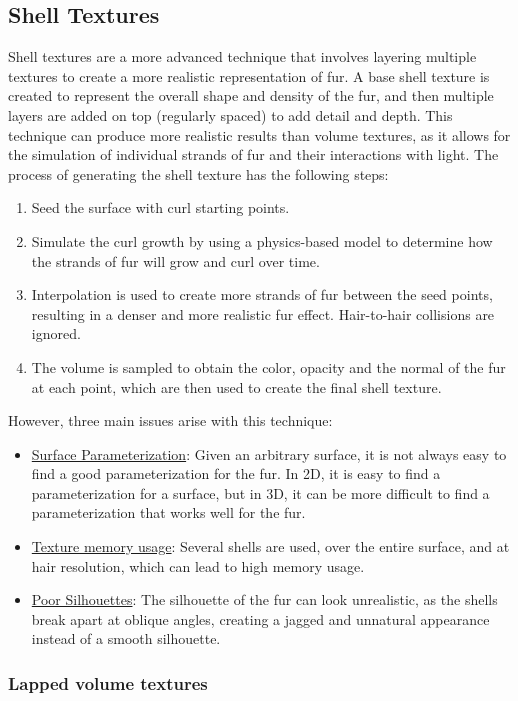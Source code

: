 \subsection{Shell Textures}

Shell textures are a more advanced technique that involves layering multiple textures to create a more realistic representation of fur. A base shell texture is created to represent the overall shape and density of the fur, and then multiple layers are added on top (regularly spaced) to add detail and depth. This technique can produce more realistic results than volume textures, as it allows for the simulation of individual strands of fur and their interactions with light. The process of generating the shell texture has the following steps:
\begin{enumerate}
    \item Seed the surface with curl starting points.
    \item Simulate the curl growth by using a physics-based model to determine how the strands of fur will grow and curl over time.
    \item Interpolation is used to create more strands of fur between the seed points, resulting in a denser and more realistic fur effect. Hair-to-hair collisions are ignored.
    \item The volume is sampled to obtain the color, opacity and the normal of the fur at each point, which are then used to create the final shell texture.
\end{enumerate}

However, three main issues arise with this technique:
\begin{itemize}
    \item \ul{Surface Parameterization}: Given an arbitrary surface, it is not always easy to find a good parameterization for the fur. In 2D, it is easy to find a parameterization for a surface, but in 3D, it can be more difficult to find a parameterization that works well for the fur.
    \item \ul{Texture memory usage}: Several shells are used, over the entire surface, and at hair resolution, which can lead to high memory usage.
    \item \ul{Poor Silhouettes}: The silhouette of the fur can look unrealistic, as the shells break apart at oblique angles, creating a jagged and unnatural appearance instead of a smooth silhouette.
\end{itemize}

\subsubsection{Lapped volume textures}

